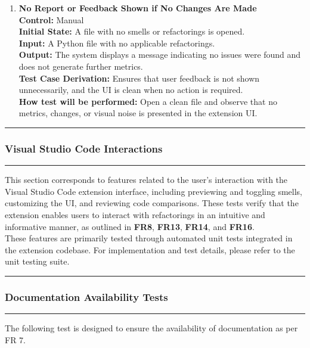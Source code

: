 \documentclass[12pt, titlepage]{article}
\newcommand{\colorrule}{\textcolor{BlueViolet}{\rule{\linewidth}{2pt}}}
\begin{document}
\begin{enumerate}[label={\bf
    \textcolor{Maroon}{test-FR-RP-\arabic*}}, wide=0pt, font=\itshape]
  \item \textbf{No Report or Feedback Shown if No Changes Are Made} \\[2mm]
    \textbf{Control:} Manual \\
    \textbf{Initial State:} A file with no smells or refactorings is opened. \\
    \textbf{Input:} A Python file with no applicable refactorings. \\
    \textbf{Output:} The system displays a message indicating no issues were found and does not generate further metrics. \\[2mm]
    \textbf{Test Case Derivation:} Ensures that user feedback is not shown unnecessarily, and the UI is clean when no action is required. \\[2mm]
    \textbf{How test will be performed:} Open a clean file and observe that no metrics, changes, or visual noise is presented in the extension UI.

\end{enumerate}

\noindent\colorrule

\subsubsection{Visual Studio Code Interactions}
\colorrule

\medskip

\noindent
This section corresponds to features related to the user’s interaction with the Visual Studio Code extension interface, including previewing and toggling smells, customizing the UI, and reviewing code comparisons. These tests verify that the extension enables users to interact with refactorings in an intuitive and informative manner, as outlined in \textbf{FR8}, \textbf{FR13}, \textbf{FR14}, and \textbf{FR16}.\\

\noindent These features are primarily tested through automated unit tests integrated in the extension codebase. For implementation and test details, please refer to the unit testing suite.

\noindent\colorrule

\subsubsection{Documentation Availability Tests}
\colorrule

\medskip

\noindent
The following test is designed to ensure the availability of
documentation as per FR 7.
\end{document}
